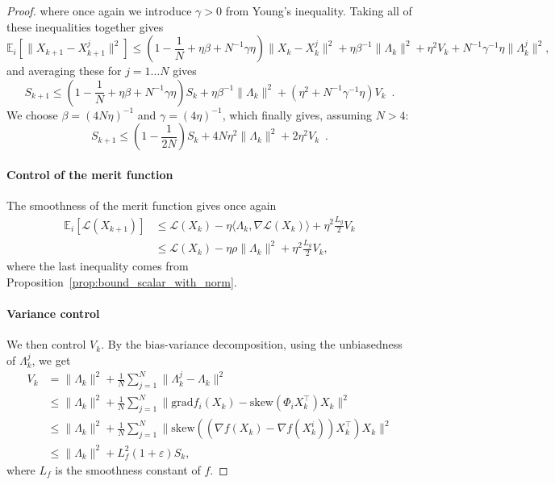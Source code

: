\documentclass[twoside,11pt]{article}
\newcommand{\grad}{{\mathrm{grad}}}
\newcommand{\sk}{{\mathrm{skew}}}
\begin{document}
\begin{proof}
    where once again we introduce $\gamma>0$ from Young's inequality.
    Taking all of these inequalities together gives
    $$\mathbb{E}_i[\|X_{k+1} - X_{k+1}^j\|^2] \leq (1 - \frac1N +\eta\beta + N^{-1}\gamma \eta) \|X_k - X_k^j\|^2 + \eta \beta^{-1}\|\Lambda_k\|^2 + \eta^2V_k + N^{-1}\gamma^{-1}\eta \|\Lambda_k^j\|^2,
    $$
    and averaging these for $j=1\dots N$ gives
    \begin{equation}
        S_{k+1}\leq (1 - \frac1N +\eta\beta + N^{-1}\gamma \eta)S_k + \eta\beta^{-1}\|\Lambda_k\|^2 +(\eta^2 +N^{-1}\gamma^{-1}\eta)V_k \enspace.
    \end{equation}
    We choose $\beta = (4N\eta)^{-1}$ and $\gamma=(4\eta)^{-1}$, which finally gives, assuming $N>4$:
    \begin{equation}
    \label{eq:distance_memory_saga}
    S_{k+1}\leq (1 - \frac1{2N})S_k + 4N\eta^2\|\Lambda_k\|^2 +2\eta^2 V_k \enspace.
    \end{equation}

    \paragraph{Control of the merit function}
    The smoothness of the merit function gives once again
    \begin{align}
        \mathbb{E}_i[\mathcal{L}(X_{k+1})]&\leq \mathcal{L}(X_{k}) - \eta \langle \Lambda_k, \nabla \mathcal{L}(X_k)\rangle + \eta^2\frac{L_g}2V_k\\
        &\leq \mathcal{L}(X_{k}) - \eta \rho \| \Lambda_k\|^2+ \eta^2\frac{L_g}2V_k,
    \end{align}
    where the last inequality comes from Proposition~\ref{prop:bound_scalar_with_norm}.
    \paragraph{Variance control}
    We then control $V_k$. By the bias-variance decomposition, using the unbiasedness of $\Lambda_k^j$, we get
    \begin{align}
    V_k &= \|\Lambda_k\|^2 +\frac1N\sum_{j=1}^N\|\Lambda_k^j - \Lambda_k\|^2\\
    &\leq \|\Lambda_k\|^2 +\frac1N\sum_{j=1}^N\|\grad f_i(X_k) - \sk(\Phi_iX_k^\top)X_k\|^2\\
    &\leq\|\Lambda_k\|^2 +\frac1N\sum_{j=1}^N\|\sk((\nabla f(X_k) - \nabla f(X_k^i))X_k^\top)X_k\|^2\\
    &\leq \|\Lambda_k\|^2 + L^2_f(1+\varepsilon)S_k,
    \end{align}
    where $L_f$ is the smoothness constant of $f$.

\end{proof}
\end{document}
